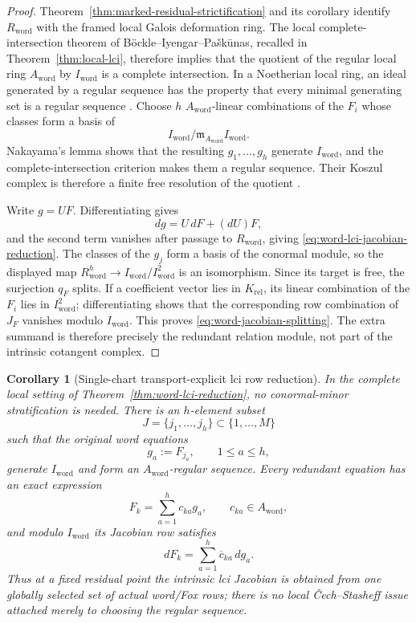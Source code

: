 \documentclass[11pt]{article}
\newtheorem{corollary}[theorem]{Corollary}
\theoremstyle{definition}
\begin{document}
\begin{proof}
Theorem~\ref{thm:marked-residual-strictification} and its corollary identify $R_{\mathrm{word}}$ with the framed local Galois deformation ring.  The local complete-intersection theorem of B\"ockle--Iyengar--Pa\v{s}k\=unas, recalled in Theorem~\ref{thm:local-lci}, therefore implies that the quotient of the regular local ring $A_{\mathrm{word}}$ by $I_{\mathrm{word}}$ is a complete intersection.  In a Noetherian local ring, an ideal generated by a regular sequence has the property that every minimal generating set is a regular sequence \cite{StacksLCI}.  Choose $h$ $A_{\mathrm{word}}$-linear combinations of the $F_i$ whose classes form a basis of
\[
 I_{\mathrm{word}}/
 \mathfrak m_{A_{\mathrm{word}}}I_{\mathrm{word}}.
\]
Nakayama's lemma shows that the resulting $g_1,\ldots,g_h$ generate $I_{\mathrm{word}}$, and the complete-intersection criterion makes them a regular sequence.  Their Koszul complex is therefore a finite free resolution of the quotient \cite{StacksKoszul}.

Write $g=UF$.  Differentiating gives
\[
 dg=U\,dF+(dU)F,
\]
and the second term vanishes after passage to $R_{\mathrm{word}}$, giving \eqref{eq:word-lci-jacobian-reduction}.  The classes of the $g_j$ form a basis of the conormal module, so the displayed map $R_{\mathrm{word}}^h\to I_{\mathrm{word}}/I_{\mathrm{word}}^2$ is an isomorphism.  Since its target is free, the surjection $q_F$ splits.  If a coefficient vector lies in $K_{\mathrm{rel}}$, its linear combination of the $F_i$ lies in $I_{\mathrm{word}}^2$; differentiating shows that the corresponding row combination of $J_F$ vanishes modulo $I_{\mathrm{word}}$.  This proves \eqref{eq:word-jacobian-splitting}.  The extra summand is therefore precisely the redundant relation module, not part of the intrinsic cotangent complex.
\end{proof}

\begin{corollary}[Single-chart transport-explicit lci row reduction]\label{cor:local-transport-explicit-lci-row-reduction}
In the complete local setting of Theorem~\ref{thm:word-lci-reduction}, no
conormal-minor stratification is needed.  There is an $h$-element subset
\[
 J=\{j_1,\ldots,j_h\}\subset\{1,\ldots,M\}
\]
such that the original word equations
\[
 g_a:=F_{j_a},\qquad 1\le a\le h,
\]
generate $I_{\mathrm{word}}$ and form an $A_{\mathrm{word}}$-regular
sequence.  Every redundant equation has an exact expression
\begin{equation}\label{eq:local-redundant-word-row-expression}
 F_k=\sum_{a=1}^{h}c_{ka}g_a,
 \qquad c_{ka}\in A_{\mathrm{word}},
\end{equation}
and modulo $I_{\mathrm{word}}$ its Jacobian row satisfies
\begin{equation}\label{eq:local-transport-explicit-lci-row-reduction}
 dF_k=\sum_{a=1}^{h}\overline c_{ka}\,dg_a.
\end{equation}
Thus at a fixed residual point the intrinsic lci Jacobian is obtained from
one globally selected set of actual word/Fox rows; there is no local
\v{C}ech--Stasheff issue attached merely to choosing the regular sequence.
\end{corollary}
\end{document}
